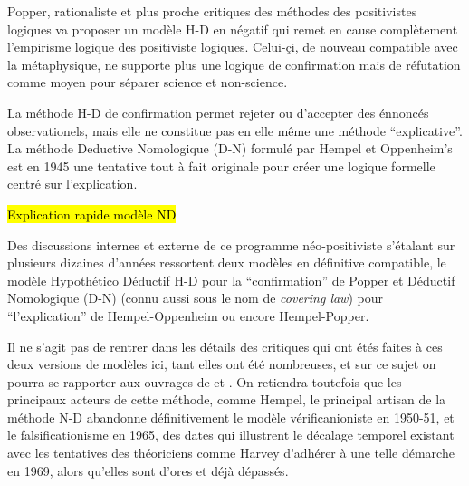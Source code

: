 Popper, rationaliste et plus proche critiques des méthodes des positivistes logiques va proposer un modèle H-D en négatif qui remet en cause complètement l'empirisme logique des positiviste logiques. Celui-çi, de nouveau compatible avec la métaphysique, ne supporte plus une logique de confirmation mais de réfutation comme moyen pour séparer science et non-science.

La méthode H-D de confirmation permet rejeter ou d'accepter des énnoncés observationels, mais elle ne constitue pas en elle même une méthode \enquote{explicative}. La méthode Deductive Nomologique (D-N) formulé par Hempel et Oppenheim’s  est en 1945 une tentative tout à fait originale pour créer une logique formelle centré sur l'explication.

\hl{Explication rapide modèle ND}

Des discussions internes et externe de ce programme néo-positiviste s'étalant sur plusieurs dizaines d'années ressortent deux modèles en définitive compatible, le modèle Hypothético Déductif H-D pour la \enquote{confirmation} de Popper et Déductif Nomologique (D-N) (connu aussi sous le nom de \textit{covering law}) pour \enquote{l'explication} de Hempel-Oppenheim ou encore Hempel-Popper.

Il ne s'agit pas de rentrer dans les détails des critiques qui ont étés faites à ces deux versions de modèles ici, tant elles ont été nombreuses, et sur ce sujet on pourra se rapporter aux ouvrages de \textcite{Chalmers1987} et \textcite[214-215]{Meyer1979}. On retiendra toutefois que les principaux acteurs de cette méthode, comme Hempel, le principal artisan de la méthode N-D abandonne définitivement le modèle vérificanioniste en 1950-51, et le falsificationisme en 1965, des dates qui illustrent le décalage temporel existant avec les tentatives des théoriciens comme Harvey d'adhérer à une telle démarche en 1969, alors qu'elles sont d'ores et déjà dépassés.


